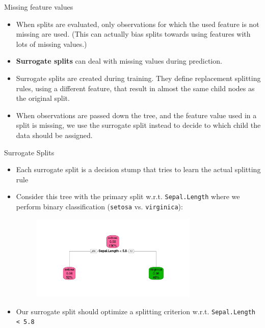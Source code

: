 \documentclass[11pt,compress,t,notes=noshow, xcolor=table]{beamer}
\begin{document}
\begin{vbframe}{Missing feature values}
  \begin{itemize}
    \item When splits are evaluated, only observations for which the used feature is not missing are used. (This can actually bias splits towards using features with lots of missing values.) 
  \item \textbf{Surrogate splits} can deal with missing values during prediction.
  \item Surrogate splits are created during training. They define replacement splitting rules, using a different feature, that result in almost the same child nodes as the original split.
   \item When observations are passed down the tree, %
   and the feature value used in a split is missing, we use the surrogate split instead to decide to which child the data should be assigned. 
  \end{itemize}
\end{vbframe}

\begin{vbframe}{Surrogate Splits}
\begin{itemize}
\item Each surrogate split is a decision stump that tries to learn the actual splitting rule
\item Consider this tree with the primary split w.r.t. \texttt{Sepal.Length} where we perform binary classification (\texttt{setosa} vs. \texttt{virginica}):
\begin{figure}
\includegraphics[width=0.75\textwidth]{figure/tree-binary.pdf} 
\end{figure}
\item Our surrogate split should optimize a splitting criterion w.r.t. \texttt{Sepal.Length < 5.8}
\end{itemize}



\end{vbframe}
\end{document}
